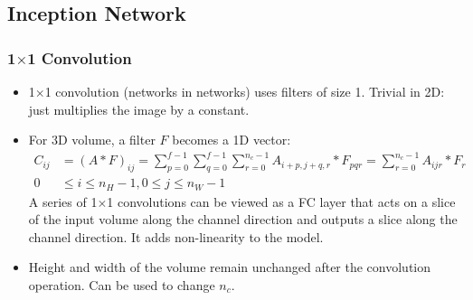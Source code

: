 \subsection{Inception Network}
\subsubsection{1$\times$1 Convolution}
\begin{itemize}
  \item 1$\times$1 convolution (networks in networks) uses filters of size 1. Trivial in 2D: just multiplies the image by a constant.
  \item For 3D volume, a filter $F$ becomes a 1D vector:
  \begin{align*}
    C_{ij}&=\left(A*F\right)_{ij}=\displaystyle\sum_{p=0}^{f-1}\displaystyle\sum_{q=0}^{f-1}\displaystyle\sum_{r=0}^{n_c-1}A_{i+p,j+q,r}*F_{pqr}=\sum_{r=0}^{n_c-1}A_{ijr}*F_{r}\\
    0&\le i\le n_H-1, 0\le j\le n_W-1
  \end{align*}
  A series of 1$\times$1 convolutions can be viewed as a FC layer that acts on a slice of the input volume along the channel direction and outputs a slice along the channel direction. It adds non-linearity to the model.
  \item Height and width of the volume remain unchanged after the convolution operation. Can be used to change $n_c$.
\end{itemize}
